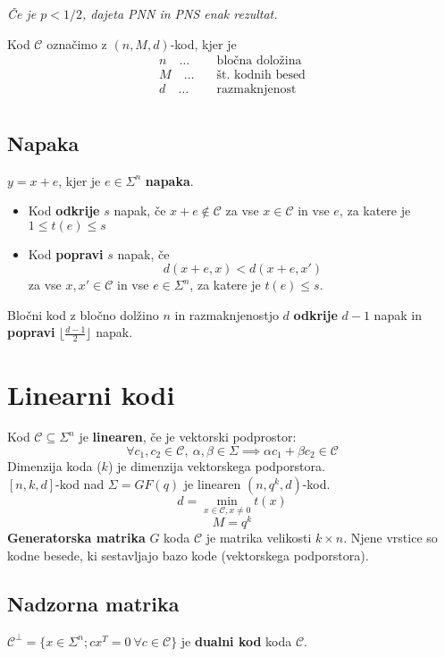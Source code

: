 \begin{multicols}{5}
\begin{itemize}
		\textit{Če je $p<1/2$, dajeta PNN in PNS enak rezultat.}
\end{itemize}


Kod $\mathcal{C}$ označimo z $(n,M,d)$-kod, kjer je
\begin{align*}
	n \quad \dots \quad & \text{bločna doložina} \\
	M \quad \dots \quad & \text{št. kodnih besed} \\
	d \quad \dots \quad & \text{razmaknjenost} \\
\end{align*}


\subsection{Napaka}
$y = x+e$, kjer je $e \in \Sigma^n$ \textbf{napaka}.
\begin{itemize}
	\item Kod \textbf{odkrije} $s$ napak, če $x+e\notin \mathcal{C}$ za vse $x\in \mathcal{C}$
		in vse $e$, za katere je $1\le t(e)\le s$
	\item Kod \textbf{popravi} $s$ napak, če
		\[d(x+e,x)<d(x+e,x')\]
		za vse $x,x'\in\mathcal{C}$ in vse $e\in\Sigma^n$, za katere je $t(e)\le s$.
\end{itemize}

Bločni kod z bločno dolžino $n$ in razmaknjenostjo $d$ \textbf{odkrije} $d-1$ napak in 
\textbf{popravi} $\lfloor \frac{d-1}{2} \rfloor$ napak.


\section{Linearni kodi}
Kod $\mathcal{C} \subseteq \Sigma^n$ je \textbf{linearen}, če je vektorski podprostor:
\[\forall c_1,c_2\in\mathcal{C},\ \alpha,\beta \in \Sigma \implies \alpha c_1 + \beta c_2\in \mathcal{C}\]
Dimenzija koda ($k$) je dimenzija vektorskega podporstora. \\

$[n,k,d]$-kod nad $\Sigma = GF(q)$ je linearen $(n,q^k,d)$-kod.
\[d = \min_{x\in \mathcal{C}, x\neq 0} t(x)\]
\[M = q^k\]
\textbf{Generatorska matrika} $G$ koda $\mathcal{C}$ je matrika velikosti $k\times n$.
Njene vrstice so kodne besede, ki sestavljajo bazo kode (vektorskega podporstora).

\subsection*{Nadzorna matrika}
$\mathcal{C}^\perp = \{x\in\Sigma^n; cx^T=0\ \forall c\in\mathcal{C}\}$ je \textbf{dualni kod} koda $\mathcal{C}$.


\end{multicols}
